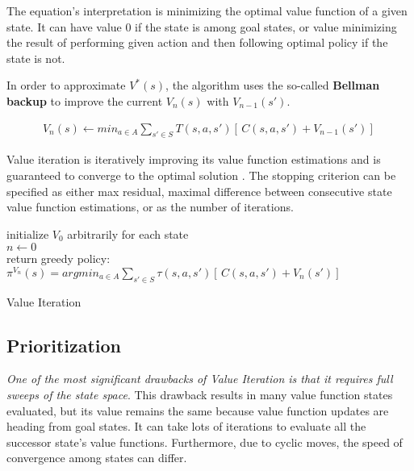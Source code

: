 The equation's interpretation is minimizing the optimal value function of a given state. It can have value 0 if the state is among goal states, or value minimizing the result of performing given action and then following optimal policy if the state is not.

In order to approximate $V^* (s)$, the algorithm uses the so-called \textbf{Bellman backup} to improve the current $V_n (s)$ with $V_{n-1} (s')$.


\begin{equation}
\begin{aligned}
V_n (s) \xleftarrow{} min_{a \in A} \sum_{s' \in S} T(s, a, s') [ \,C(s, a, s') + V_{n - 1} (s')] \,
\end{aligned}
\end{equation}

Value iteration is iteratively improving its value function estimations and is guaranteed to converge to the optimal solution \cite{Kolobov2012}. The stopping criterion can be specified as either max residual, maximal difference between consecutive state value function estimations, or as the number of iterations.

\LinesNumbered
\begin{algorithm}
\SetAlgoLined
initialize $V_0$ arbitrarily for each state \\
$n \xleftarrow{} 0$ \\ 
return greedy policy: $\pi^{V_n} (s) = argmin_{a \in A} \sum_{s' \in S} \tau(s, a, s')[ \,C(s, a, s') + V_n (s')] \,$
\caption{Value Iteration}
\end{algorithm}


\subsection{Prioritization}
\textit{One of the most significant drawbacks of Value Iteration is that it requires full sweeps of the state space}. This drawback results in many value function states evaluated, but its value remains the same because value function updates are heading from goal states. It can take lots of iterations to evaluate all the successor state's value functions. Furthermore, due to cyclic moves, the speed of convergence among states can differ.

